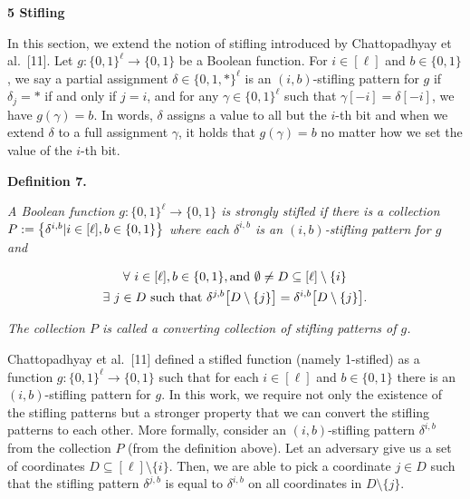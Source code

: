 \documentclass[10pt,a4paper]{article}
\begin{document}
\par\medskip\noindent\textbf{
5 Stifling}\par




In this section, we extend the notion of stifling introduced by Chattopadhyay et al. [11].
Let $g:\{0,1\}^{\ell}\to\{0,1\}$ be a Boolean function.
For $i\in[\ell]$ and $b\in\{0,1\}$, we say a partial assignment $\delta\in\{0,1,*\}^{\ell}$ is an $(i,b)$-stifling pattern for $g$ if $\delta_{j}=*$ if and only if $j=i$, and for any $\gamma\in\{0,1\}^{\ell}$ such that $\gamma[-i]=\delta[-i]$, we have $g(\gamma)=b$.
In words, $\delta$ assigns a value to all but the $i$-th bit and when we extend $\delta$ to a full assignment $\gamma$, it holds that $g(\gamma)=b$ no matter how we set the value of the $i$-th bit.\par





\par\medskip\noindent\textbf{
\textbf{Definition 7}\textbf{.}
}\par



\emph{A Boolean function $g:\{0,1\}^{\ell}\to\{0,1\}$ is strongly stifled if there is a collection $P:=\bigl{\{}\delta^{i,b}|i\in[\ell],b\in\{0,1\}\bigr{\}}$ where each $\delta^{i,b}$ is an $(i,b)$-stifling pattern for $g$ and}\par


\[\begin{gathered}
\displaystyle\forall\nobreak\ i\in[\ell],b\in\{0,1\},\text{and }%
\emptyset\neq D\subseteq[\ell]\setminus\{i\} \\
\displaystyle\exists\nobreak\ j\in D\text{ such that }\delta^{j,b}%
\bigl{[}D\setminus\{j\}\bigr{]}=\delta^{i,b}\bigl{[}D\setminus\{j\}\bigr{]}.
\end{gathered}\]


\emph{The collection $P$ is called a converting collection of stifling patterns of $g$.}\par






Chattopadhyay et al. [11] defined a stifled function (namely 1-stifled) as a function $g:\{0,1\}^{\ell}\to\{0,1\}$ such that for each $i\in[\ell]$ and $b\in\{0,1\}$ there is an $(i,b)$-stifling pattern for $g$.
In this work, we require not only the existence of the stifling patterns but a stronger property that we can convert the stifling patterns to each other.
More formally, consider an $(i,b)$-stifling pattern $\delta^{i,b}$ from the collection $P$ (from the definition above).
Let an adversary give us a set of coordinates $D\subseteq[\ell]\setminus\{i\}$.
Then, we are able to pick a coordinate $j\in D$ such that the stifling pattern $\delta^{j,b}$ is equal to $\delta^{i,b}$ on all coordinates in $D\setminus\{j\}$.\par
\end{document}
